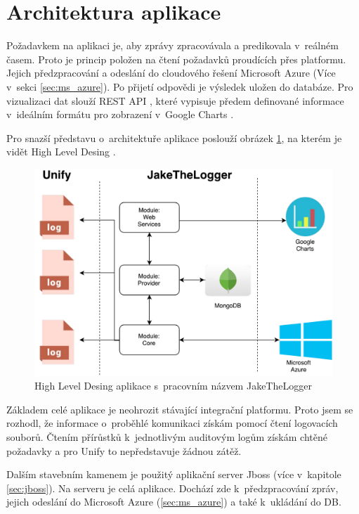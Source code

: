 \documentclass[thesis=M,czech]{FITthesis}[2012/10/20]
\newcommand{\tmpframe}[1]{\fbox{#1}}
\renewcommand{\tmpframe}[1]{#1}
\begin{document}
	\section{Architektura aplikace}
	Požadavkem na aplikaci je, aby zprávy zpracovávala a predikovala v~reálném časem. Proto je princip položen na čtení požadavků proudících přes platformu. Jejich předzpracování a odeslání do cloudového řešení Microsoft Azure (Více v~sekci \ref{sec:ms_azure}). Po přijetí odpovědi je výsledek uložen do databáze. Pro vizualizaci dat slouží REST API \cite{rest}, které vypisuje předem definované informace v~ideálním formátu pro zobrazení v~Google Charts \cite{googleCharts}.
	
	Pro snazší představu o~architektuře aplikace poslouží obrázek \ref{fig:hld_architecture}, na kterém je vidět High Level Desing \cite{hld_johnson}.
	
	\begin{figure}[htb]\centering
		\tmpframe{\includegraphics[width=\textwidth]{./img/jake_HLD}}		
		\caption{High Level Desing aplikace s~pracovním názvem JakeTheLogger}
		\label{fig:hld_architecture}
	\end{figure}

	Základem celé aplikace je neohrozit stávající integrační platformu. Proto jsem se rozhodl, že informace o~proběhlé komunikaci získám pomocí čtení logovacích souborů.
	Čtením přírůstků k~jednotlivým auditovým logům získám chtěné požadavky a pro Unify to nepředstavuje žádnou zátěž.
	
	Dalším stavebním kamenem je použitý aplikační server Jboss (více v~kapitole \ref{sec:jboss}). Na serveru je celá aplikace. Dochází zde k~předzpracování zpráv, jejich odeslání do Microsoft Azure (\ref{sec:ms_azure}) a také k~ukládání do DB.
	
\end{document}
